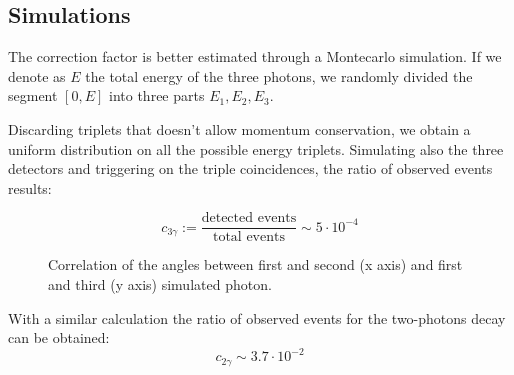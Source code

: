 \documentclass[main.tex]{subfiles}
\begin{document}
\subsection{Simulations}

The correction factor is better estimated through a Montecarlo simulation. If we denote as $E$ the total energy of the three photons, we randomly divided the segment $[0,E]$ into three parts $E_1,E_2,E_3$.
%
%
%

Discarding triplets that doesn't allow momentum conservation, we obtain a uniform distribution on all the possible energy triplets. %
Simulating also the three detectors and triggering on the triple coincidences, the ratio of observed events results:

\begin{equation*}
  c_{3\gamma} := \frac{\text{detected events}}{\text{total events}} \sim 5\cdot10^{-4}
\end{equation*}

\begin{figure}[H]
  \centering
  \caption{Correlation of the angles between first and second (x axis) and first and third (y axis) simulated photon.}
  \label{fig:sim:ang:corr}
\end{figure}

With a similar calculation the ratio of observed events for the two-photons decay can be obtained:
\begin{equation*}
  c_{2\gamma} \sim 3.7\cdot10^{-2}
\end{equation*}
\end{document}
